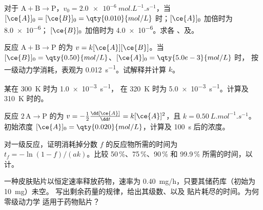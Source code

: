 \begin{exercise}[$\star\star$]\label{exo:b1:rate-laws:6}
对于 $\mathrm{A} + \mathrm{B} \longrightarrow \mathrm{P}$，$v_0 = \qty{2.0e-6}{mol.L^{-1}.s^{-1}}$，当 $[\ce{A}]_0
= [\ce{B}]_0 = \qty{0.010}{mol/L}$ 时；$[\ce{A}]_0$ 加倍时为 \qty{8.0e-6}{}；
$[\ce{B}]_0$ 加倍时为 \qty{4.0e-6}{}。求各
、及。
\end{exercise}

\begin{exercise}[$\star\star$]\label{exo:b1:rate-laws:7}
反应 $\mathrm{A} + \mathrm{B} \longrightarrow \mathrm{P}$ 的为 $v = k[\ce{A}][\ce{B}]$。当
$[\ce{B}]_0 = \qty{0.50}{mol/L}$、$[\ce{A}]_0 = \qty{5.0e-3}{mol/L}$ 时，
 按一级动力学消耗，表观为
\qty{0.012}{s^{-1}}。试解释并计算 $k$。
\end{exercise}

\begin{exercise}[$\star\star$]\label{exo:b1:rate-laws:8}
某在 \qty{300}{K} 时为 \qty{1.0e-3}{s^{-1}}，
在 \qty{320}{K} 时为 \qty{5.0e-3}{s^{-1}}。计算及
\qty{310}{K} 时的。
\end{exercise}

\begin{exercise}[$\star\star$]\label{exo:b1:rate-laws:9}
反应 $2\,\mathrm{A} \longrightarrow \mathrm{P}$ 的为 $v = -\frac12\frac{\dd[\ce{A}]}
{\dd t} = k[\ce{A}]^2$，且 $k = \qty{0.50}{L.mol^{-1}.s^{-1}}$。
初始浓度 $[\ce{A}]_0 = \qty{0.020}{mol/L}$，计算及
\qty{100}{s} 后的浓度。
\end{exercise}

\begin{exercise}[$\star\star\star$]\label{exo:b1:rate-laws:10}
对一级反应，证明消耗掉分数
$f$ 的反应物所需的时间为 $t_f = -\ln(1 - f)/(ak)$。比较
50\,\%、75\,\%、90\,\% 和 99.9\,\% 所需的时间，以计。
\end{exercise}

\begin{exercise}[$\star\star\star$]\label{exo:b1:rate-laws:11}
一种皮肤贴片以恒定速率释放药物，速率为
\qty{0.40}{mg/h}，只要其储药库（初始为 \qty{10}{mg}）未空。
写出剩余药量的规律，给出其级数、以及
贴片耗尽的时间。为何零级动力学
适用于药物贴片？
\end{exercise}

